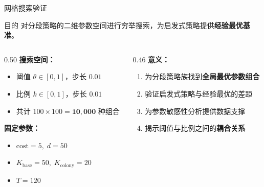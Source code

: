 \documentclass[aspectratio=169, 11pt]{beamer}
\begin{document}
\begin{frame}{网格搜索验证}
  \begin{block}{目的}
    对分段策略的二维参数空间进行穷举搜索，为启发式策略提供\textbf{经验最优基准}。
  \end{block}

  \vspace{0.2cm}
  \begin{columns}[T]
    \begin{column}{0.50\textwidth}
      \textbf{搜索空间：}
      \begin{itemize}
        \item 阈值 $\theta \in [0, 1]$，步长 $0.01$
        \item 比例 $k \in [0, 1]$，步长 $0.01$
        \item 共计 $100 \times 100 = \mathbf{10{,}000}$ 种组合
      \end{itemize}
      \vspace{0.2cm}
      \textbf{固定参数：}
      \begin{itemize}
        \item $\text{cost} = 5,\; d = 50$
        \item $K_{\text{base}} = 50,\; K_{\text{colony}} = 20$
        \item $T = 120$
      \end{itemize}
    \end{column}
    \begin{column}{0.46\textwidth}
      \textbf{意义：}
      \begin{enumerate}
        \item 为分段策略族找到\textbf{全局最优参数组合}
        \item 验证启发式策略与经验最优的差距
        \item 为参数敏感性分析提供数据支撑
        \item 揭示阈值与比例之间的\textbf{耦合关系}
      \end{enumerate}
    \end{column}
  \end{columns}

\end{frame}
\end{document}
